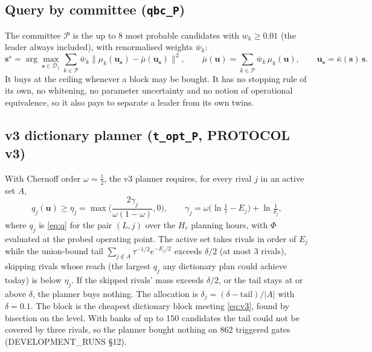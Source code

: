 \documentclass[11pt]{article}
\theoremstyle{definition}
\newcommand{\bu}{\bm{u}}
\newcommand{\bs}{\bm{s}}
\newcommand{\cD}{\mathcal{D}}
\newcommand{\cP}{\mathcal{P}}
\newcommand{\code}[1]{\texttt{#1}}
\begin{document}
{\subsection{Query by committee (\code{qbc\_P})}
The committee $\cP$ is the up to 8 most probable candidates with $w_k\ge0.01$ (the leader always included), with renormalised weights $\bar w_k$:
\begin{equation}
  \bs^\star=\arg\max_{\bs\in\cD_1}\sum_{k\in\cP}\bar w_k\big\|\mu_k(\bu_{\bs})-\bar\mu(\bu_{\bs})\big\|^2,\qquad
  \bar\mu(\bu)=\sum_{k\in\cP}\bar w_k\,\mu_k(\bu),\qquad \bu_{\bs}=\bar\kappa(\bs)\,\bs .
\end{equation}
It buys at the ceiling whenever a block may be bought. It has no stopping rule of its own, no whitening, no parameter uncertainty and no notion of operational equivalence, so it also pays to separate a leader from its own twins.

\subsection{v3 dictionary planner (\code{t\_opt\_P}, PROTOCOL v3)}
With Chernoff order $\omega=\tfrac12$, the v3 planner requires, for every rival $j$ in an active set $A$,
\begin{equation}\label{eq:v3}
  q_j(\bu)\ge\eta_j=\max\!\Big(\frac{2\gamma_j}{\omega(1-\omega)},0\Big),\qquad
  \gamma_j=\omega\big(\ln\tfrac{1}{\tau}-E_j\big)+\ln\tfrac{1}{\delta_j},
\end{equation}
where $q_j$ is \eqref{eq:q} for the pair $(L,j)$ over the $H_r$ planning hours, with $\Phi$ evaluated at the probed operating point. The active set takes rivals in order of $E_j$ while the union-bound tail $\sum_{j\notin A}\tau^{-1/2}e^{-E_j/2}$ exceeds $\delta/2$ (at most 3 rivals), skipping rivals whose reach (the largest $q_j$ any dictionary plan could achieve today) is below $\eta_j$. If the skipped rivals' mass exceeds $\delta/2$, or the tail stays at or above $\delta$, the planner buys nothing. The allocation is $\delta_j=(\delta-\text{tail})/|A|$ with $\delta=0.1$. The block is the cheapest dictionary block meeting \eqref{eq:v3}, found by bisection on the level. With banks of up to 150 candidates the tail could not be covered by three rivals, so the planner bought nothing on 862 triggered gates (DEVELOPMENT\_RUNS \S12).

}
\end{document}
